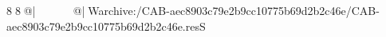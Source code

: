 8  8  @|                                                  @| W   archive:/CAB-aec8903c79e2b9cc10775b69d2b2c46e/CAB-aec8903c79e2b9cc10775b69d2b2c46e.resS 